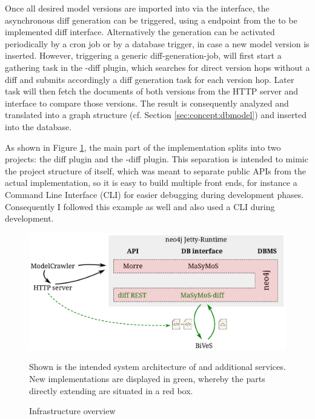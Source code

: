 Once all desired model versions are imported into \masymos via the \morre interface, the  asynchronous diff generation can be triggered, using a \rest endpoint from the to be implemented diff \rest interface. Alternatively the generation can be activated periodically by a cron job or by a database trigger, in case a new model version is inserted.
However, triggering a generic diff-generation-job, will first start a gathering task in the \masymos-diff plugin, which searches for direct version hops without a diff and submits accordingly a diff generation task for each version hop. 
Later task will then fetch the \xml documents of both versions from the HTTP server and interface \bives to compare those versions. The result is consequently analyzed and translated into a graph structure (cf. Section \ref{sec:concept:dbmodel}) and inserted into the database.

As shown in Figure \ref{fig:system-overview}, the main part of the implementation splits into two projects: the diff \rest plugin and the \masymos-diff plugin. This separation is intended to mimic the project structure of \masymos itself, which was meant to separate public APIs from the actual implementation, so it is easy to build multiple front ends, for instance a Command Line Interface (CLI) for easier debugging during development phases. Consequently I followed this example as well and also used a CLI during development.

\begin{figure}[h]
	\centering
	\includegraphics[width=\textwidth]{resources/system-overview-matrix.pdf}
	\caption{Infrastructure overview}
	\begin{flushleft}
		Shown is the intended system architecture of \masymos \neoj and additional services. New implementations are displayed in green, whereby the parts directly extending \neoj are situated in a red box.
	\end{flushleft}
	\label{fig:system-overview}
\end{figure}

